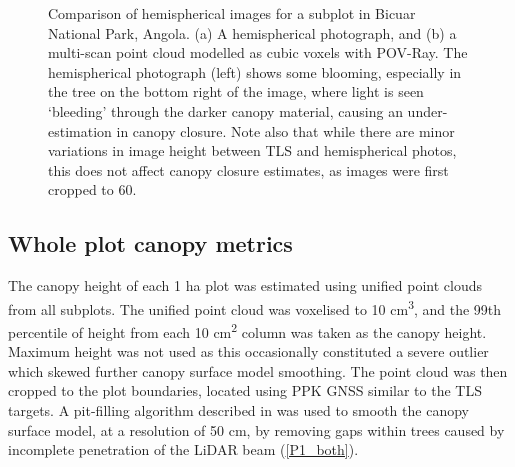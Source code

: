 \documentclass[11pt,a4paper]{article}
\begin{document}
\begin{figure}
\begin{subfigure}{0.45\linewidth}
		\caption{}
		\label{hemi_tls}
	\end{subfigure}
	\caption{Comparison of hemispherical images for a subplot in Bicuar National Park, Angola. (a) A hemispherical photograph, and (b) a multi-scan point cloud modelled as cubic voxels with POV-Ray. The hemispherical photograph (left) shows some blooming, especially in the tree on the bottom right of the image, where light is seen `bleeding' through the darker canopy material, causing an under-estimation in canopy closure. Note also that while there are minor variations in image height between TLS and hemispherical photos, this does not affect canopy closure estimates, as images were first cropped to 60\textdegree{}.}
	\label{hemi_tls_ex}
\end{figure}

\subsection{Whole plot canopy metrics}

The canopy height of each 1 ha plot was estimated using unified point clouds from all subplots. The unified point cloud was voxelised to 10 cm\textsuperscript{3}, and the 99th percentile of height from each 10 cm\textsuperscript{2} column was taken as the canopy height. Maximum height was not used as this occasionally constituted a severe outlier which skewed further 
canopy surface model smoothing. The point cloud was then cropped to the plot boundaries, located using PPK GNSS similar to the TLS targets. A pit-filling algorithm described in \citet{Khosravipour2014} was used to smooth the canopy surface model, at a resolution of 50 cm, by removing gaps within trees caused by incomplete penetration of the LiDAR beam (\autoref{P1_both}). 
\end{document}
